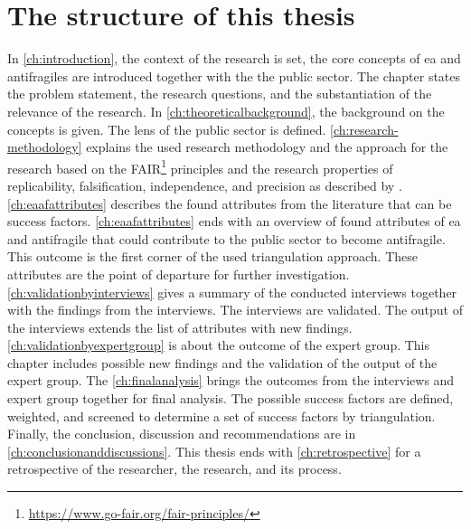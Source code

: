\section{The structure of this thesis}
\label{sec:structure}
In \cref{ch:introduction}, the context of the research is set, the core concepts of \acrshort{ea} and \glspl{antifragile} are introduced together with the the public sector. The chapter states the problem statement, the research questions, and the substantiation of the relevance of the research. In \cref{ch:theoreticalbackground}, the background on the concepts is given. The lens of the public sector is defined. \cref{ch:research-methodology} explains the used research methodology and the approach for the research based on the FAIR\footnote{\url{https://www.go-fair.org/fair-principles/}} principles and the research properties of replicability, falsification, independence, and precision as described by \textcite{Recker2013}. \cref{ch:eaafattributes} describes the found attributes from the literature that can be success factors.  \cref{ch:eaafattributes} ends with an overview of found attributes of \acrshort{ea} and \gls{antifragile} that could contribute to the public sector to become \gls{antifragile}. This outcome is the first corner of the used triangulation approach. These attributes are the point of departure for further investigation. \cref{ch:validationbyinterviews} gives a summary of the conducted interviews together with the findings from the interviews. The interviews are validated. The output of the interviews extends the list of attributes with new findings. \cref{ch:validationbyexpertgroup} is about the outcome of the expert group. This chapter includes possible new findings and the validation of the output of the expert group. The \cref{ch:finalanalysis} brings the outcomes from the interviews and expert group together for final analysis. The possible success factors are defined, weighted, and screened to determine a set of success factors by triangulation. Finally, the conclusion, discussion and recommendations are in \cref{ch:conclusionanddiscussions}. This thesis ends with \cref{ch:retrospective} for a retrospective of the researcher, the research, and its process.
